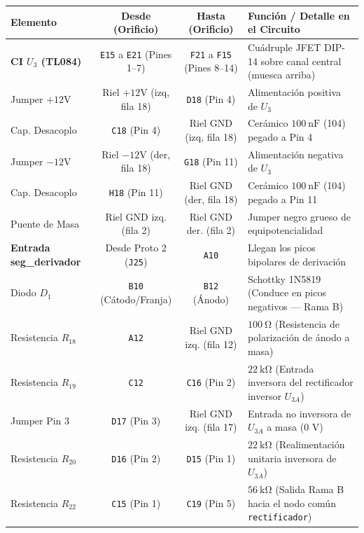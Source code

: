 \documentclass[10pt, a4paper]{article}
\begin{document}
\begin{center}
\small
\renewcommand{\arraystretch}{1.08}
\begin{tabularx}{\textwidth}{l c c X}
\toprule
\textbf{Elemento} & \textbf{Desde (Orificio)} & \textbf{Hasta (Orificio)} & \textbf{Función / Detalle en el Circuito} \\
\midrule
\rowcolor{softgray} \textbf{CI $U_3$ (TL084)} & \texttt{E15} a \texttt{E21} (Pines 1--7) & \texttt{F21} a \texttt{F15} (Pines 8--14) & Cuádruple JFET DIP-14 sobre canal central (muesca arriba) \\
Jumper $+12\text{V}$ & Riel $+12\text{V}$ (izq, fila 18) & \texttt{D18} (Pin 4) & Alimentación positiva de $U_3$ \\
\rowcolor{softgray} Cap. Desacoplo & \texttt{C18} (Pin 4) & Riel GND (izq, fila 18) & Cerámico $\SI{100}{\nano\farad}$ (104) pegado a Pin 4 \\
Jumper $-12\text{V}$ & Riel $-12\text{V}$ (der, fila 18) & \texttt{G18} (Pin 11) & Alimentación negativa de $U_3$ \\
\rowcolor{softgray} Cap. Desacoplo & \texttt{H18} (Pin 11) & Riel GND (der, fila 18) & Cerámico $\SI{100}{\nano\farad}$ (104) pegado a Pin 11 \\
Puente de Masa & Riel GND izq. (fila 2) & Riel GND der. (fila 2) & Jumper negro grueso de equipotencialidad \\
\midrule
\textbf{Entrada seg\_derivador} & Desde Proto 2 (\texttt{J25}) & \texttt{A10} & Llegan los picos bipolares de derivación \\
\rowcolor{softgray} Diodo $D_1$ & \texttt{B10} (Cátodo/Franja) & \texttt{B12} (Ánodo) & Schottky 1N5819 (Conduce en picos negativos --- Rama B) \\
Resistencia $R_{18}$ & \texttt{A12} & Riel GND izq. (fila 12) & $\SI{100}{\ohm}$ (Resistencia de polarización de ánodo a masa) \\
\rowcolor{softgray} Resistencia $R_{19}$ & \texttt{C12} & \texttt{C16} (Pin 2) & $\SI{22}{\kilo\ohm}$ (Entrada inversora del rectificador inversor $U_{3A}$) \\
Jumper Pin 3 & \texttt{D17} (Pin 3) & Riel GND izq. (fila 17) & Entrada no inversora de $U_{3A}$ a masa ($0\text{ V}$) \\
\rowcolor{softgray} Resistencia $R_{20}$ & \texttt{D16} (Pin 2) & \texttt{D15} (Pin 1) & $\SI{22}{\kilo\ohm}$ (Realimentación unitaria inversora de $U_{3A}$) \\
Resistencia $R_{22}$ & \texttt{C15} (Pin 1) & \texttt{C19} (Pin 5) & $\SI{56}{\kilo\ohm}$ (Salida Rama B hacia el nodo común \texttt{rectificador}) \\

\end{tabularx}
\end{center}
\end{document}
